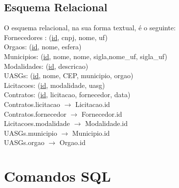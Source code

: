 \documentclass{article}
\begin{document}
\subsection {Esquema Relacional}
\noindent
O esquema relacional, na sua forma textual, é o seguinte: \\[10pt]
Fornecedores : (\underline{id}, cnpj, nome, uf) \\
Orgaos: (\underline{id}, nome, esfera) \\
Municipios: (\underline{id}, nome, nome, sigla,nome\_uf, sigla\_uf) \\
Modalidades: (\underline{id}, descricao) \\
UASGs: (\underline{id}, nome, CEP, municipio, orgao) \\
Licitacoes: (\underline{id}, modalidade, uasg) \\
Contratos: (\underline{id}, licitacao, fornecedor, data) \\[5pt]
Contratos.licitacao $\rightarrow$ Licitacao.id \\
Contratos.fornecedor $\rightarrow$ Fornecedor.id \\
Licitacoes.modalidade $\rightarrow$ Modalidade.id \\
UASGs.municipio $\rightarrow$ Municipio.id \\
UASGs.orgao $\rightarrow$ Orgao.id


\section{Comandos SQL}

\noindent
\end{document}
